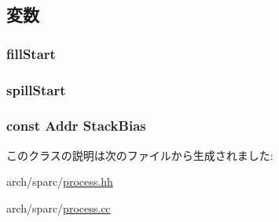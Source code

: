 \subsection{変数}
\hypertarget{classSparcLiveProcess_a8d30128bf1e2f675a5a3cc5ea79ddb96}{
\subsubsection[{fillStart}]{ {\bf fillStart}}}
\label{classSparcLiveProcess_a8d30128bf1e2f675a5a3cc5ea79ddb96}
\hypertarget{classSparcLiveProcess_a4377422380fb1e1eb5626cb9a631cd65}{
\subsubsection[{spillStart}]{ {\bf spillStart}}}
\label{classSparcLiveProcess_a4377422380fb1e1eb5626cb9a631cd65}
\hypertarget{classSparcLiveProcess_a0c923d515c84756a72003bff7ed696b0}{
\subsubsection[{StackBias}]{\setlength{\rightskip}{0pt plus 5cm}const {\bf Addr} {\bf StackBias}}}
\label{classSparcLiveProcess_a0c923d515c84756a72003bff7ed696b0}


このクラスの説明は次のファイルから生成されました:\begin{DoxyCompactItemize}
\item 
arch/sparc/\hyperlink{arch_2sparc_2process_8hh}{process.hh}\item 
arch/sparc/\hyperlink{arch_2sparc_2process_8cc}{process.cc}\end{DoxyCompactItemize}
